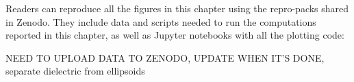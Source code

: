 Readers can reproduce all the figures in this chapter using the repro-packs shared in Zenodo. They include 
data and scripts needed to run the computations reported in this chapter, as well as Jupyter notebooks with 
all the plotting code:

{\color{red} NEED TO UPLOAD DATA TO ZENODO, UPDATE WHEN IT'S DONE, separate dielectric from ellipsoids}
